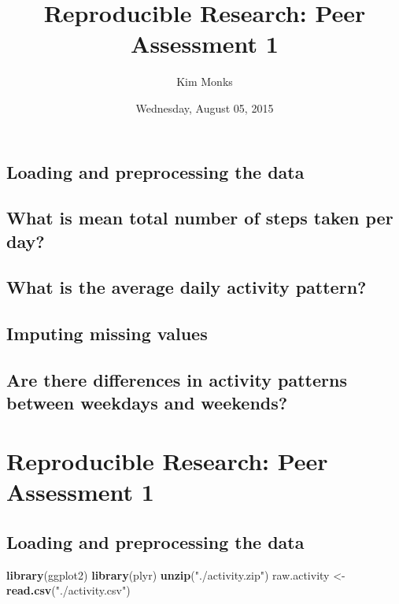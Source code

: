 \documentclass[]{article}
\title{Reproducible Research: Peer Assessment 1}
\author{Kim Monks}
\date{Wednesday, August 05, 2015}
\newenvironment{Shaded}{\begin{snugshade}}{\end{snugshade}}
\newcommand{\KeywordTok}[1]{\textcolor[rgb]{0.13,0.29,0.53}{\textbf{{#1}}}}
\newcommand{\StringTok}[1]{\textcolor[rgb]{0.31,0.60,0.02}{{#1}}}
\newcommand{\NormalTok}[1]{{#1}}
\begin{document}
\maketitle


\subsection{Loading and preprocessing the
data}\label{loading-and-preprocessing-the-data}

\subsection{What is mean total number of steps taken per
day?}\label{what-is-mean-total-number-of-steps-taken-per-day}

\subsection{What is the average daily activity
pattern?}\label{what-is-the-average-daily-activity-pattern}

\subsection{Imputing missing values}\label{imputing-missing-values}

\subsection{Are there differences in activity patterns between weekdays
and
weekends?}\label{are-there-differences-in-activity-patterns-between-weekdays-and-weekends}

\section{Reproducible Research: Peer Assessment
1}\label{reproducible-research-peer-assessment-1}

\subsection{Loading and preprocessing the
data}\label{loading-and-preprocessing-the-data-1}

\begin{Shaded}
\begin{Highlighting}[]
\KeywordTok{library}\NormalTok{(ggplot2)}
\KeywordTok{library}\NormalTok{(plyr)}
\KeywordTok{unzip}\NormalTok{(}\StringTok{"./activity.zip"}\NormalTok{) }
\NormalTok{raw.activity <-}\StringTok{ }\KeywordTok{read.csv}\NormalTok{(}\StringTok{"./activity.csv"}\NormalTok{)}
\end{Highlighting}
\end{Shaded}
\end{document}
